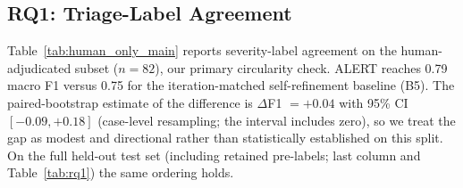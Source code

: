 \subsection{RQ1: Triage-Label Agreement}

Table~\ref{tab:human_only_main} reports severity-label agreement on the human-adjudicated subset ($n{=}82$), our primary circularity check. ALERT reaches 0.79 macro F1 versus 0.75 for the iteration-matched self-refinement baseline (B5). The paired-bootstrap estimate of the difference is $\Delta$F1 ${=}{+}0.04$ with 95\% CI $[{-}0.09,{+}0.18]$ (case-level resampling; the interval includes zero), so we treat the gap as modest and directional rather than statistically established on this split. On the full held-out test set (including retained pre-labels; last column and Table~\ref{tab:rq1}) the same ordering holds.

\begin{table}[t]
\centering
\caption{Macro severity-label agreement. F1/P/R are on the human-adjudicated test subset ($n{=}82$; primary result). $\pm$ denotes half-widths of 95\% percentile bootstrap CIs for each system's \emph{marginal} macro-F1 (case-level resampling, $10{,}000$ resamples). The last column is F1 on the full held-out test set, which includes retained pre-labels (Table~\ref{tab:rq1}).}
\label{tab:human_only_main}
\small
\setlength{\tabcolsep}{3pt}
\end{table}

